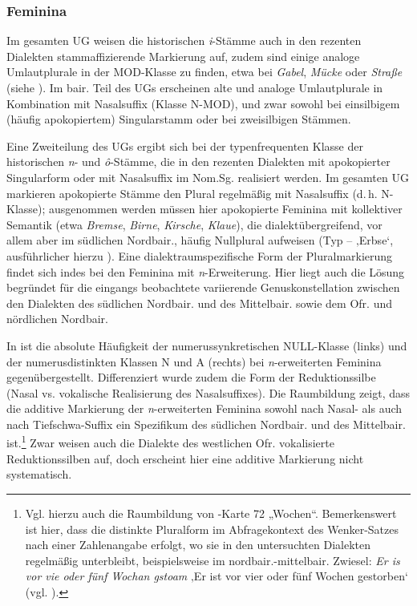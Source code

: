 \subsubsection{Feminina}
\label{sec:8.3.1.3}
Im gesamten UG weisen die historischen \textit{i}{}-Stämme auch in den rezenten Dialekten stammaffizierende Markierung auf, zudem sind einige analoge Umlautplurale in der MOD-Klasse zu finden, etwa bei \textit{Gabel}, \textit{Mücke} oder \textit{Straße} (siehe ). Im bair. Teil des UGs erscheinen alte und analoge Umlautplurale in Kombination mit Nasalsuffix (Klasse N-MOD), und zwar sowohl bei einsilbigem (häufig apokopiertem) Singularstamm oder bei zweisilbigen Stämmen.

Eine Zweiteilung des UGs ergibt sich bei der typenfrequenten Klasse der his\-to\-ri\-schen \textit{n}{}- und \textit{ô}{}-Stämme, die in den rezenten Dialekten mit apokopierter Singularform oder mit Nasalsuffix im Nom.Sg. realisiert werden. Im gesamten UG markieren apokopierte Stämme den Plural regelmäßig mit Nasalsuffix (d.\,h. N-Klasse); ausgenommen werden müssen hier apokopierte Feminina mit kollektiver Semantik (etwa \textit{Bremse}, \textit{Birne}, \textit{Kirsche}, \textit{Klaue}), die dialektübergreifend, vor allem aber im südlichen Nordbair., häufig Nullplural aufweisen (Typ --  ‚Erbse‘, ausführlicher hierzu ). Eine dialektraumspezifische Form der Pluralmarkierung findet sich indes bei den Feminina mit \textit{n}{}-Erweiterung. Hier liegt auch die Lösung begründet für die eingangs beobachtete variierende Genuskonstellation zwischen den Dialekten des südlichen Nordbair. und des Mittelbair. sowie dem Ofr. und nördlichen Nordbair.

In  ist die absolute Häufigkeit der numerussynkretischen NULL-Klas\-se (links) und der numerusdistinkten Klassen N und A (rechts) bei \textit{n}{}-erweiterten Feminina gegenübergestellt. Differenziert wurde zudem die Form der Reduktionssilbe (Nasal vs. vokalische Realisierung des Nasalsuffixes). Die Raumbildung zeigt, dass die additive Markierung der \textit{n}{}-erweiterten Feminina sowohl nach Nasal- als auch nach Tiefschwa-Suffix ein Spezifikum des südlichen Nordbair. und des Mittelbair. ist.\footnote{Vgl. hierzu auch die Raumbildung von \citealt{WA}-Karte 72 „Wochen“. Bemerkenswert ist hier, dass die distinkte Pluralform im Abfragekontext des Wenker-Satzes nach einer Zahlenangabe erfolgt, wo sie in den untersuchten Dialekten regelmäßig unterbleibt, beispielsweise im nordbair.-mittelbair. Zwiesel: \textit{Er is vor vie oder fünf Wochan gstoam} ‚Er ist vor vier oder fünf Wochen gestorben‘ (vgl. ).} Zwar weisen auch die Dialekte des westlichen Ofr. vokalisierte Reduktionssilben auf, doch erscheint hier eine additive Markierung nicht systematisch.

